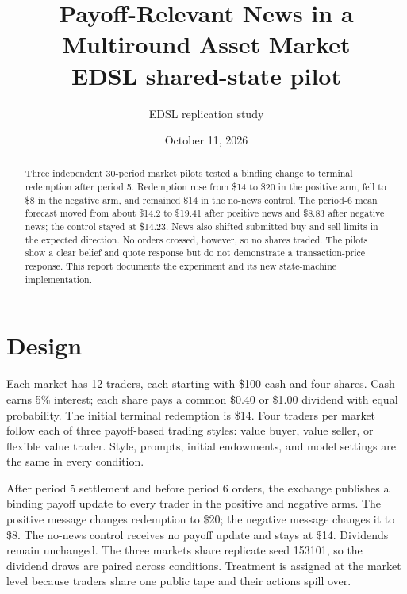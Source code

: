 \documentclass[11pt]{article}
\title{Payoff-Relevant News in a Multiround Asset Market\\\large EDSL shared-state pilot}
\author{EDSL replication study}
\date{October 11, 2026}
\begin{document}
\maketitle

\begin{abstract}
Three independent 30-period market pilots tested a binding change to terminal
redemption after period 5. Redemption rose from \$14 to \$20 in the positive
arm, fell to \$8 in the negative arm, and remained \$14 in the no-news control.
The period-6 mean forecast moved from about \$14.2 to \$19.41 after positive
news and \$8.83 after negative news; the control stayed at \$14.23. News also
shifted submitted buy and sell limits in the expected direction. No orders
crossed, however, so no shares traded. The pilots show a clear belief and quote
response but do not demonstrate a transaction-price response. This report
documents the experiment and its new state-machine implementation.
\end{abstract}

\section{Design}
Each market has 12 traders, each starting with \$100 cash and four shares.
Cash earns 5\% interest; each share pays a common \$0.40 or \$1.00 dividend
with equal probability. The initial terminal redemption is \$14. Four traders
per market follow each of three payoff-based trading styles: value buyer, value
seller, or flexible value trader. Style, prompts, initial endowments, and model
settings are the same in every condition.

After period 5 settlement and before period 6 orders, the exchange publishes a
binding payoff update to every trader in the positive and negative arms. The
positive message changes redemption to \$20; the negative message changes it
to \$8. The no-news control receives no payoff update and stays at \$14.
Dividends remain unchanged. The three markets share replicate seed 153101, so
the dividend draws are paired across conditions. Treatment is assigned at the
market level because traders share one public tape and their actions spill over.
\end{document}
